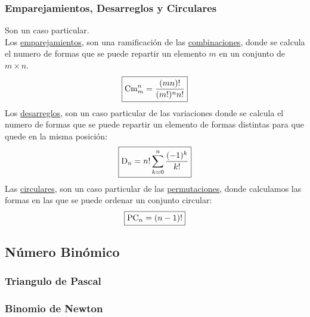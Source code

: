 \subsubsection{Emparejamientos, Desarreglos y Circulares}
\noindent Son un caso particular. \\ Los \underline{emparejamientos}, son una ramificación de las \underline{combinaciones}, donde se calcula el numero de formas que se puede repartir un elemento \(m\) en un conjunto de \(m \times n\).
\[
        \boxed{\textnormal{Cm}_m^n= \frac{(mn)!}{(m!)^{n}n!}}
\]
\noindent Los \underline{desarreglos}, son un caso particular de las variaciones donde se calcula el numero de formas que se puede repartir un elemento de formas distintas para que quede en la misma posición:
\[
        \boxed{\textnormal{D}_n = n!\sum_{k=0}^n\frac{(-1)^k}{k!}}
\]
\noindent Las \underline{circulares}, son un caso particular de las \underline{permutaciones}, donde calculamos las formas en las que se puede ordenar un conjunto circular:
\[
        \boxed{\textnormal{PC}_n = (n-1)!}
\]
\subsection{Número Binómico}
\subsubsection{Triangulo de Pascal}
\subsubsection{Binomio de Newton}